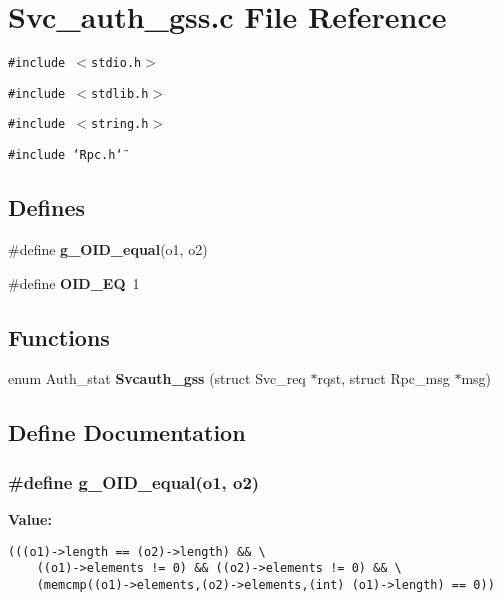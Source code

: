 \section{Svc\_\-auth\_\-gss.c File Reference}
\label{Svc__auth__gss_8c}
{\tt \#include $<$stdio.h$>$}\par
{\tt \#include $<$stdlib.h$>$}\par
{\tt \#include $<$string.h$>$}\par
{\tt \#include \char`\"{}Rpc.h\char`\"{}}\par
\subsection*{Defines}
\begin{CompactItemize}
\item 
\#define {\bf g\_\-OID\_\-equal}(o1, o2)
\item 
\#define {\bf OID\_\-EQ}\ 1
\end{CompactItemize}
\subsection*{Functions}
\begin{CompactItemize}
\item 
enum Auth\_\-stat {\bf Svcauth\_\-gss} (struct Svc\_\-req $\ast$rqst, struct Rpc\_\-msg $\ast$msg)
\end{CompactItemize}


\subsection{Define Documentation}
\subsubsection{\setlength{\rightskip}{0pt plus 5cm}\#define g\_\-OID\_\-equal(o1, o2)}\label{Svc__auth__gss_8c_a0}


{\bf Value:}

\footnotesize\begin{verbatim}(((o1)->length == (o2)->length) && \
    ((o1)->elements != 0) && ((o2)->elements != 0) && \
    (memcmp((o1)->elements,(o2)->elements,(int) (o1)->length) == 0))
\end{verbatim}\normalsize 



